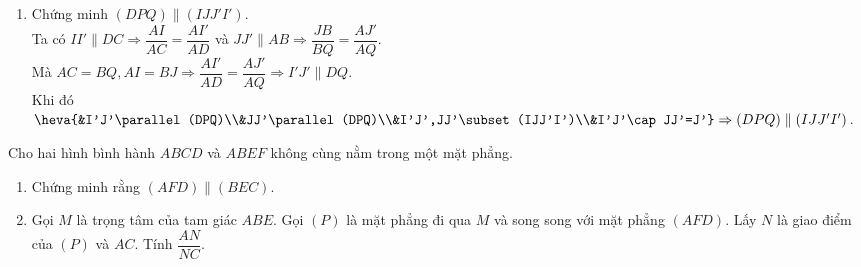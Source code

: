 \begin{bt}
{\begin{enumerate}
	\item Chứng minh $(DPQ)\parallel(IJJ'I')$.\\
	Ta có $II'\parallel DC\Rightarrow\dfrac{AI}{AC}=\dfrac{AI'}{AD}$ và 	$JJ'\parallel AB\Rightarrow\dfrac{JB}{BQ}=\dfrac{AJ'}{AQ}$.\\
	Mà $AC=BQ, AI=BJ\Rightarrow\dfrac{AI'}{AD}=\dfrac{AJ'}{AQ}\Rightarrow I'J'\parallel DQ$.\\
	Khi đó $\heva{&I'J'\parallel(DPQ)\\&JJ'\parallel(DPQ)\\&I'J',JJ'\subset(IJJ'I')\\&I'J'\cap JJ'=J'}\Rightarrow(DPQ)\parallel(IJJ'I')$.
\end{enumerate}}
\end{bt}

\begin{bt}%
	Cho  hai hình bình hành $ABCD$ và $ABEF$ không cùng nằm trong một mặt phẳng.
	\begin{enumerate}
		\item Chứng minh  rằng $(AFD)\parallel(BEC)$.
		\item Gọi $M$ là trọng tâm của tam giác $ABE$. Gọi $(P)$ là mặt phẳng đi qua $M$  và song song với mặt phẳng $(AFD)$. Lấy $N$ là giao điểm của $(P)$ và $A C$. Tính $\dfrac{AN}{NC}$.
	\end{enumerate}
\end{bt}
